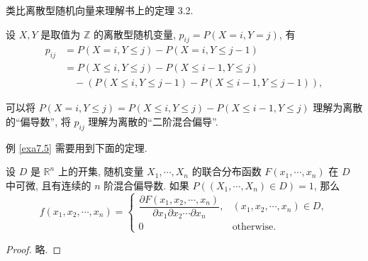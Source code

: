 \documentclass[color=black,device=normal,lang=cn]{elegantnote}
\numberwithin{equation}{section}
\theoremstyle{plain}
\numberwithin{exercise}{exsection}
\begin{document}
类比离散型随机向量来理解书上的定理 3.2.
\begin{example}
    设 $X,Y$ 是取值为 $\mathbb{Z}$ 的离散型随机变量, $p_{ij}=P(X=i,Y=j)$, 有
    \begin{align*}
        p_{ij} & =P(X=i,Y\leq j)-P(X=i,Y\leq j-1) \\
        & =P(X\leq i,Y\leq j)-P(X\leq i-1,Y\leq j) \\
        & \quad-(P(X\leq i,Y\leq j-1)-P(X\leq i-1,Y\leq j-1)),
    \end{align*}

    可以将 $P(X=i,Y\leq j)=P(X\leq i,Y\leq j)-P(X\leq i-1,Y\leq j)$ 理解为离散的``偏导数'', 将 $p_{ij}$ 理解为离散的``二阶混合偏导''.
\end{example}

例 \ref{exa7.5} 需要用到下面的定理.
\begin{theorem}\label{t7.2}
    设 $D$ 是 $\mathbb{R}^n$ 上的开集, 随机变量 $X_1,\cdots,X_n$ 的联合分布函数 $F(x_1,\cdots,x_n)$ 在 $D$ 中可微, 且有连续的 $n$ 阶混合偏导数. 如果 $P((X_1,\cdots,X_n)\in D)=1$, 那么
    \[f(x_1,x_2,\cdots,x_n)=\begin{cases}
        \dfrac{\partial F(x_1,x_2,\cdots,x_n)}{\partial x_1\partial x_2\cdots\partial x_n}, & (x_1,x_2,\cdots,x_n)\in D, \\
        0 & \text{otherwise}.
    \end{cases}\]
\end{theorem}
\begin{proof}
    略.
\end{proof}
\end{document}
